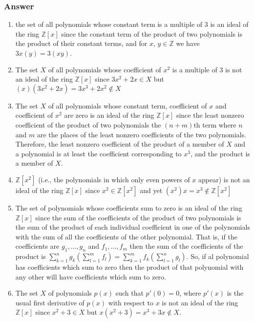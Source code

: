 \documentclass[12pt]{article}
\begin{document}
\subsubsection{Answer}
\begin{enumerate}
\item the set of all polynomials whose constant term is a multiple of $3$ is an ideal of the ring $\mathbb{Z} [x]$ since the constant term of the product of two polynomials is the product of their constant terms, and for $x$, $y \in \mathbb{Z}$ we have $3x(y)=3(xy)$.
\item The set $X$ of all polynomials whose coefficient of $x^2$ is a multiple of $3$ is not an ideal of the ring $\mathbb{Z} [x]$ since $3x^2+2x\in X$ but $(x)(3x^2+2x)=3x^3+2x^2 \notin X$
\item The set $X$ of all polynomials whose constant term, coefficient of $x$ and coefficient of $x^2$ are zero  is an ideal of the ring $\mathbb{Z} [x]$ since the least nonzero coefficient of the product of two polynomials the $(n+m)\mathrm{th}$ term where $n$ and $m$ are the places of the least nonzero coefficients of the two polynomials. Therefore, the least nonzero coefficient of the product of a member of $X$ and a polynomial is at least the coefficient corresponding to $x^3$, and the product is a member of $X$.
\item $\mathbb{Z}[x^2]$ (i.e., the polynomials in which only even powers of $x$ appear)  is not an ideal of the ring $\mathbb{Z} [x]$ since $x^2 \in \mathbb{Z}[x^2]$ and yet $(x^2)x = x^3 \notin \mathbb{Z}[x^2]$
\item The set of polynomials whose coefficients sum to zero  is an ideal of the ring $\mathbb{Z} [x]$ since the sum of the coefficients of the product of two polynomials is the sum of the product of each individual coefficient in one of the polynomials with the sum of all the coefficients of the other polynomial. That is, if the coefficients are $g_1, \dots, g_n$ and $f_1,\dots,f_m$ then the sum of the coefficients of the product is $\sum_{k=1}^n g_k \left( \sum_{l=1}^m f_l\right)=\sum_{k=1}^m f_k \left( \sum_{l=1}^n g_l\right)$. So, if al polynomial has coefficients which sum to zero then the product of that polynomial with any other will have coefficients which sum to zero.
\item The set $X$ of polynomials $p(x)$ such that $p'(0)=0$, where $p'(x)$ is the usual first derivative of $p(x)$ with respect to $x$   is not an ideal of the ring $\mathbb{Z} [x]$ since $x^2+3 \in X$ but $x(x^2+3)=x^3+3x\notin X$.
\end{enumerate}
\end{document}
